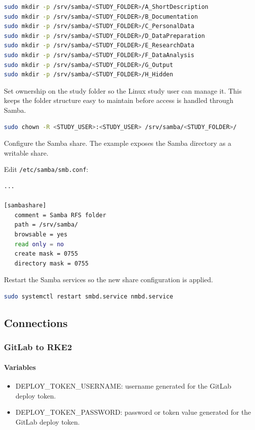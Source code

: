 \documentclass{article}
\begin{document}
\begin{lstlisting}[language=sh]
sudo mkdir -p /srv/samba/<STUDY_FOLDER>/A_ShortDescription
sudo mkdir -p /srv/samba/<STUDY_FOLDER>/B_Documentation
sudo mkdir -p /srv/samba/<STUDY_FOLDER>/C_PersonalData
sudo mkdir -p /srv/samba/<STUDY_FOLDER>/D_DataPreparation
sudo mkdir -p /srv/samba/<STUDY_FOLDER>/E_ResearchData
sudo mkdir -p /srv/samba/<STUDY_FOLDER>/F_DataAnalysis
sudo mkdir -p /srv/samba/<STUDY_FOLDER>/G_Output
sudo mkdir -p /srv/samba/<STUDY_FOLDER>/H_Hidden
\end{lstlisting}

Set ownership on the study folder so the Linux study user can manage it. This keeps the folder structure easy to maintain before access is handled through Samba.

\begin{lstlisting}[language=sh]
sudo chown -R <STUDY_USER>:<STUDY_USER> /srv/samba/<STUDY_FOLDER>/
\end{lstlisting}

Configure the Samba share. The example exposes the Samba directory as a writable share.

\vspace{0.5cm}

Edit \texttt{/etc/samba/smb.conf}:
\begin{lstlisting}[language=sh]
...

[sambashare]
   comment = Samba RFS folder
   path = /srv/samba/
   browsable = yes
   read only = no
   create mask = 0755
   directory mask = 0755
\end{lstlisting}

Restart the Samba services so the new share configuration is applied.

\begin{lstlisting}[language=sh]
sudo systemctl restart smbd.service nmbd.service
\end{lstlisting}

\subsection{Connections}

\vspace{0.4cm}
\subsubsection{GitLab to RKE2}

\paragraph{Variables}
\begin{itemize}
	\item DEPLOY\_TOKEN\_USERNAME: username generated for the GitLab deploy token.
	\item DEPLOY\_TOKEN\_PASSWORD: password or token value generated for the GitLab deploy token.
\end{itemize}
\end{document}
